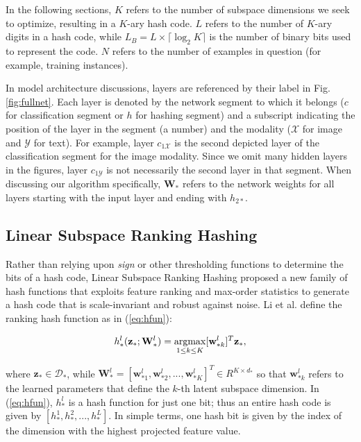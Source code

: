 \documentclass[letterpaper]{article}
\newcommand{\argmax}{\operatornamewithlimits{argmax}}
\begin{document}
In the following sections, $ K $ refers to the number of subspace dimensions we seek to optimize, resulting in a $K$-ary hash code. $ L $ refers to the number of $K$-ary digits in a hash code, while $ L_B = L \times \lceil\log_{2}K\rceil $ is  the number of binary bits used to represent the code. $ N $ refers to the number of examples in question (for example, training instances).

In model architecture discussions, layers are referenced by their label in Fig. \ref{fig:fullnet}. Each layer is denoted by the network segment to which it belongs ($ c $ for classification segment or $ h $ for hashing segment) and a subscript indicating the position of the layer in the segment (a number) and the modality ($ \mathcal{X} $ for image and $ \mathcal{Y} $ for text). For example, layer $ c_{1\mathcal{X}} $ is the second depicted layer of the classification segment for the image modality. Since we omit many hidden layers in the figures, layer $ c_{1\mathcal{Y}} $ is not necessarily the second layer in that segment. When discussing our algorithm specifically, $ \mathbf{W_*} $ refers to the network weights for all layers starting with the input layer and ending with $ h_{2*} $.

\subsection{Linear Subspace Ranking Hashing}

Rather than relying upon \emph{sign} or other thresholding functions to determine the bits of a hash code, Linear Subspace Ranking Hashing \cite{kai} proposed a new family of hash functions that exploits feature ranking and max-order statistics to generate a hash code that is scale-invariant and robust against noise. Li et al. define the ranking hash function as in (\ref{eq:hfun}):

\begin{equation}
\label{eq:hfun}
h_*^l(\mathbf{z}_*; \mathbf{W}_*^l) = \argmax\limits_{1 \leq k \leq K} [\mathbf{w}_{*k}^l]^T \mathbf{z}_*,
\end{equation}

\noindent where $ \mathbf{z_*} \in \mathcal{D}_* $, while $ \mathbf{W}_*^l = [\mathbf{w}_{*1}^l, \mathbf{w}_{*2}^l, ..., \mathbf{w}_{*K}^l]^T \in R^{K \times d_*} $ so that $ \mathbf{w}_{*k}^l $ refers to the learned parameters that define the $k$-th latent subspace dimension. In (\ref{eq:hfun}), $ h_*^l $ is a hash function for just one bit; thus an entire hash code is given by $ [h_*^1, h_*^2, ..., h_*^L] $. In simple terms, one hash bit is given by the index of the dimension with the highest projected feature value.
\end{document}
